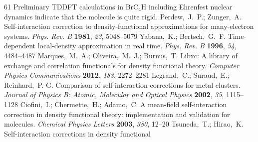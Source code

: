 \documentclass[journal=jacsat,manuscript=article]{achemso}
\begin{document}
\begin{mcitethebibliography}{61}
{\mcitedefaultendpunct}{\mcitedefaultseppunct}\relax
\EndOfBibitem
{}
Preliminary TDDFT calculations in $\text{BrC}_{4}\text{H}$ including Ehrenfest
  nuclear dynamics indicate that the molecule is quite rigid.\relax
\mciteBstWouldAddEndPunctfalse
\mciteSetBstMidEndSepPunct{\mcitedefaultmidpunct}
{}{\mcitedefaultseppunct}\relax
\EndOfBibitem
{}
Perdew,~J.~P.; Zunger,~A. Self-interaction correction to density-functional
  approximations for many-electron systems. \emph{Phys. Rev. B} \textbf{1981},
  \emph{23}, 5048--5079\relax
\mciteBstWouldAddEndPuncttrue
\mciteSetBstMidEndSepPunct{\mcitedefaultmidpunct}
{\mcitedefaultendpunct}{\mcitedefaultseppunct}\relax
\EndOfBibitem
{}
Yabana,~K.; Bertsch,~G.~F. Time-dependent local-density approximation in real
  time. \emph{Phys. Rev. B} \textbf{1996}, \emph{54}, 4484--4487\relax
\mciteBstWouldAddEndPuncttrue
\mciteSetBstMidEndSepPunct{\mcitedefaultmidpunct}
{\mcitedefaultendpunct}{\mcitedefaultseppunct}\relax
\EndOfBibitem
{}
Marques,~M.~A.; Oliveira,~M.~J.; Burnus,~T. Libxc: A library of exchange and
  correlation functionals for density functional theory. \emph{Computer Physics
  Communications} \textbf{2012}, \emph{183}, 2272--2281\relax
\mciteBstWouldAddEndPuncttrue
\mciteSetBstMidEndSepPunct{\mcitedefaultmidpunct}
{\mcitedefaultendpunct}{\mcitedefaultseppunct}\relax
\EndOfBibitem
{}
Legrand,~C.; Suraud,~E.; Reinhard,~P.-G. Comparison of
  self-interaction-corrections for metal clusters. \emph{Journal of Physics B:
  Atomic, Molecular and Optical Physics} \textbf{2002}, \emph{35},
  1115--1128\relax
\mciteBstWouldAddEndPuncttrue
\mciteSetBstMidEndSepPunct{\mcitedefaultmidpunct}
{\mcitedefaultendpunct}{\mcitedefaultseppunct}\relax
\EndOfBibitem
{}
Ciofini,~I.; Chermette,~H.; Adamo,~C. A mean-field self-interaction correction
  in density functional theory: implementation and validation for molecules.
  \emph{Chemical Physics Letters} \textbf{2003}, \emph{380}, 12--20\relax
\mciteBstWouldAddEndPuncttrue
\mciteSetBstMidEndSepPunct{\mcitedefaultmidpunct}
{\mcitedefaultendpunct}{\mcitedefaultseppunct}\relax
\EndOfBibitem
{}
Tsuneda,~T.; Hirao,~K. Self-interaction corrections in density functional

\end{mcitethebibliography}
\end{document}
